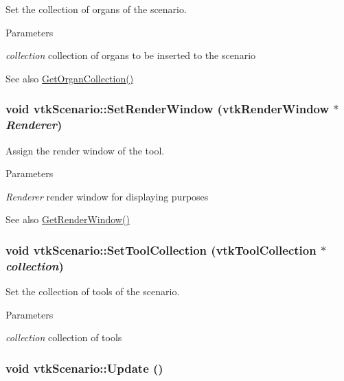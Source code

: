 Set the collection of organs of the scenario. 


\begin{DoxyParams}{Parameters}
\item[{\em collection}]collection of organs to be inserted to the scenario \end{DoxyParams}
\begin{DoxySeeAlso}{See also}
\hyperlink{classvtkScenario_a9e518be8bb47a65ae2b8a8ef02f579df}{GetOrganCollection()} 
\end{DoxySeeAlso}
\hypertarget{classvtkScenario_a65e86f64884268d0e100345d472a35c8}{
\subsubsection[{SetRenderWindow}]{\setlength{\rightskip}{0pt plus 5cm}void vtkScenario::SetRenderWindow (vtkRenderWindow $\ast$ {\em Renderer})}}
\label{classvtkScenario_a65e86f64884268d0e100345d472a35c8}


Assign the render window of the tool. 


\begin{DoxyParams}{Parameters}
\item[{\em Renderer}]render window for displaying purposes \end{DoxyParams}
\begin{DoxySeeAlso}{See also}
\hyperlink{classvtkScenario_a4a3cb31864be1da763b5acb3377a32db}{GetRenderWindow()} 
\end{DoxySeeAlso}
\hypertarget{classvtkScenario_a50915d4f98502e2b99745b99e89d0522}{
\subsubsection[{SetToolCollection}]{\setlength{\rightskip}{0pt plus 5cm}void vtkScenario::SetToolCollection ({\bf vtkToolCollection} $\ast$ {\em collection})}}
\label{classvtkScenario_a50915d4f98502e2b99745b99e89d0522}


Set the collection of tools of the scenario. 


\begin{DoxyParams}{Parameters}
\item[{\em collection}]collection of tools \end{DoxyParams}
\hypertarget{classvtkScenario_aac52c3827cbdc1d3db03fb313f664cc0}{
\subsubsection[{Update}]{\setlength{\rightskip}{0pt plus 5cm}void vtkScenario::Update ()}}
\label{classvtkScenario_aac52c3827cbdc1d3db03fb313f664cc0}


